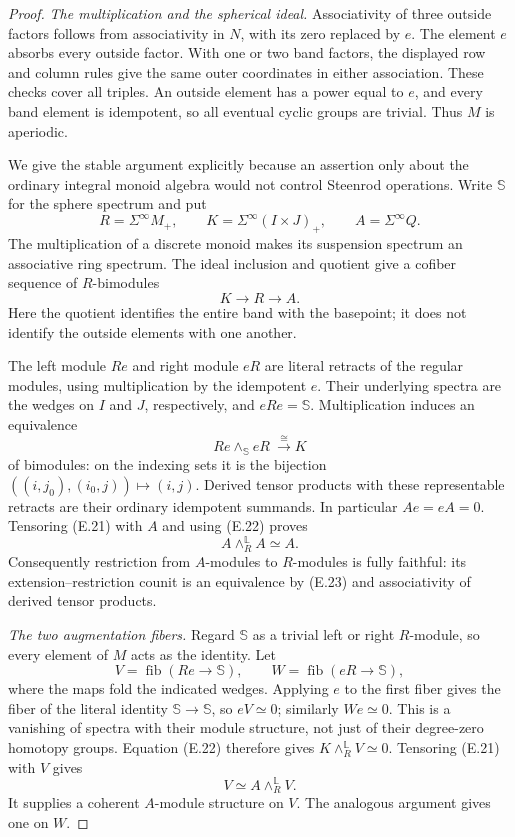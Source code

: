 \begin{proof}
\emph{The multiplication and the spherical ideal.}
Associativity of three outside factors follows from associativity in
$N$, with its zero replaced by $e$.  The element $e$ absorbs every
outside factor.  With one or two band factors, the displayed row and
column rules give the same outer coordinates in either association.
These checks cover all triples.  An outside element has a power equal
to $e$, and every band element is idempotent, so all eventual cyclic
groups are trivial.  Thus $M$ is aperiodic.

We give the stable argument explicitly because an assertion only about
the ordinary integral monoid algebra would not control Steenrod
operations.  Write $\mathbb S$ for the sphere spectrum and put
\[
 R=\Sigma^\infty M_+,\qquad
 K=\Sigma^\infty(I\times J)_+,\qquad
 A=\Sigma^\infty Q.
\]
The multiplication of a discrete monoid makes its suspension spectrum
an associative ring spectrum.  The ideal inclusion and quotient give
a cofiber sequence of $R$-bimodules
\[
 K\longrightarrow R\longrightarrow A.                 \tag{E.21}
\]
Here the quotient identifies the entire band with the basepoint; it
does not identify the outside elements with one another.

The left module $Re$ and right module $eR$ are literal retracts of
the regular modules, using multiplication by the idempotent $e$.
Their underlying spectra are the wedges on $I$ and $J$, respectively,
and $eRe=\mathbb S$.  Multiplication induces an equivalence
\[
 Re\mathbin{\wedge}_{\mathbb S}eR\ \xrightarrow{\ \cong\ }K
                                                        \tag{E.22}
\]
of bimodules: on the indexing sets it is the bijection
$((i,j_0),(i_0,j))\mapsto(i,j)$.
Derived tensor products with these representable retracts are their
ordinary idempotent summands.  In particular $Ae=eA=0$.  Tensoring
(E.21) with $A$ and using (E.22) proves
\[
 A\mathbin{\wedge}^{\mathbb L}_R A\simeq A.             \tag{E.23}
\]
Consequently restriction from $A$-modules to $R$-modules is fully
faithful: its extension--restriction counit is an equivalence by
(E.23) and associativity of derived tensor products.

\emph{The two augmentation fibers.}
Regard $\mathbb S$ as a trivial left or right $R$-module, so every
element of $M$ acts as the identity.  Let
\[
 V=\operatorname{fib}(Re\longrightarrow\mathbb S),\qquad
 W=\operatorname{fib}(eR\longrightarrow\mathbb S),        \tag{E.24}
\]
where the maps fold the indicated wedges.  Applying $e$ to the first
fiber gives the fiber of the literal identity
$\mathbb S\to\mathbb S$, so $eV\simeq0$; similarly $We\simeq0$.
This is a vanishing of spectra with their module structure, not just
of their degree-zero homotopy groups.  Equation (E.22) therefore gives
$K\wedge_R^{\mathbb L}V\simeq0$.  Tensoring (E.21) with $V$ gives
\[
 V\simeq A\mathbin{\wedge}^{\mathbb L}_R V.
\]
It supplies a coherent $A$-module structure on $V$.  The analogous
argument gives one on $W$.


\end{proof}
